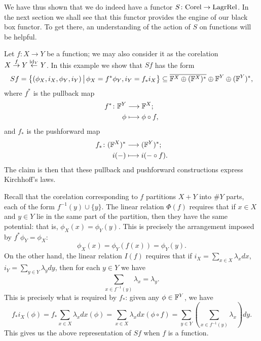 We have thus shown that we do indeed have a functor $S{\colon} \mathrm{Corel} \to
\mathrm{LagrRel}$. In the next section we shall see that this functor provides
the engine of our black box functor. To get there, an understanding of the
action of $S$ on functions will be helpful.

\begin{example} \label{ex:sympfunction}
  Let $f: X \to Y$ be a function; we may also consider it as the corelation $X
  \stackrel{f}\to Y \stackrel{\mathrm{id}_Y}\leftarrow Y$. In this example we show that
  $Sf$ has the form 
  \[
    Sf = \big\{(\phi_X,i_X,\phi_Y,i_Y) \, \big\vert \, \phi_X = f^\ast\phi_Y,
    i_Y = f_\ast i_X \big\} \subseteq \overline{{\mathbb F}^X \oplus ({\mathbb F}^X)^\ast} \oplus
    {\mathbb F}^Y \oplus ({\mathbb F}^Y)^\ast,
  \]
  where $f^\ast$ is the pullback map
  \begin{align*}
    f^\ast{\colon} {\mathbb F}^Y &\longrightarrow {\mathbb F}^X; \\
    \phi &\longmapsto \phi \circ f,
  \end{align*}
  and $f_\ast$ is the pushforward map
  \begin{align*}
    f_\ast{\colon} ({\mathbb F}^X)^\ast &\longrightarrow ({\mathbb F}^Y)^\ast; \\
    i(-) &\longmapsto i(-\circ f).
  \end{align*}
  The claim is then that these pullback and pushforward constructions express
  Kirchhoff's laws.

  Recall that the corelation corresponding to $f$ partitions $X+Y$ into $\#Y$
  parts, each of the form $f^{-1}(y) \cup \{y\}$. The linear relation $\Phi(f)$
  requires that if $x \in X$ and $y \in Y$ lie in the same part of the
  partition, then they have the same potential: that is, $\phi_X(x) =
  \phi_Y(y)$. This is precisely the arrangement imposed by $f^\ast \phi_Y =
  \phi_X$: 
  \[
    \phi_X(x) = \phi_Y(f(x)) =\phi_Y(y).
  \] 
  On the other hand, the linear relation $I(f)$ requires that if $i_X = \sum_{x 
  \in X}\lambda_xdx$, $i_Y = \sum_{y \in Y}\lambda_y dy$, then for each $y \in Y$
  we have 
  \[
    \sum_{x \in f^{-1}(y)} \lambda_x = \lambda_y.
  \]
  This is precisely what is required by $f_\ast$: given any $\phi \in {\mathbb F}^Y$, we
  have
  \[
    f_\ast i_X(\phi) = f_\ast \sum_{x \in X}\lambda_xdx(\phi) = \sum_{x
    \in X}\lambda_xdx(\phi \circ f)= \sum_{y \in Y}\left( \sum_{x \in f^{-1}(y)}
    \lambda_x\right)dy.
  \]
  This gives us the above representation of $Sf$ when $f$ is a function.
\end{example}


